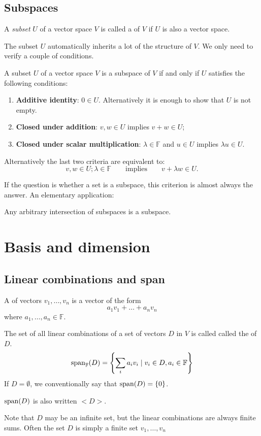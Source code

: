 \subsection{Subspaces}
\begin{definition}
A \textit{subset} $U$ of a vector space $V$ is called a  of $V$ if $U$ is also a vector space.
\end{definition}
The subset $U$ automatically inherits a lot of the structure of $V$. We only need to verify a couple of conditions.
\begin{proposition} \label{prop:subspaceCriterion}
A subset $U$ of a vector space $V$ is a subspace of $V$ \textup{if and only if} $U$ satisfies the following conditions:
\begin{enumerate}
\item \textbf{Additive identity}: $0 \in U$. Alternatively it is enough to show that $U$ is not empty.
\item \textbf{Closed under addition}: $v,w \in U$ implies $v+w\in U$;
\item \textbf{Closed under scalar multiplication}: $\lambda \in \mathbb{F}$ and $u\in U$ implies $\lambda u \in U$.
\end{enumerate}
\end{proposition}
Alternatively the last two criteria are equivalent to:
\[ v,w\in U; \lambda \in \mathbb{F} \qquad \text{implies} \qquad v+\lambda w \in U. \]

If the question is whether a set is a subspace, this criterion is almost always the answer. An elementary application:
\begin{proposition}
Any arbitrary intersection of subspaces is a subspace.
\end{proposition}

\section{Basis and dimension}
\subsection{Linear combinations and span}
\begin{definition}
A  of vectors $v_1, \ldots, v_n$ is a vector of the form
\[ a_1v_1 + \ldots + a_nv_n \]
where $a_1, \ldots, a_n \in \mathbb{F}$.
\end{definition}
\begin{definition}
The set of all linear combinations of a set of vectors $D$ in $V$ is called called the  of $D$.
\[ \operatorname{span}_{\mathbb{F}}(D) = \left\{ \sum_i a_iv_i \;|\; v_i\in D, a_i \in \mathbb{F} \right\} \]
If $D=\emptyset$, we conventionally say that $\operatorname{span}(D) = \{0\}$.

$\operatorname{span}(D)$ is also written $<D>$.
\end{definition}
Note that $D$ may be an infinite set, but the linear combinations are always finite sums. Often the set $D$ is simply a finite set $v_1,\ldots, v_n$

